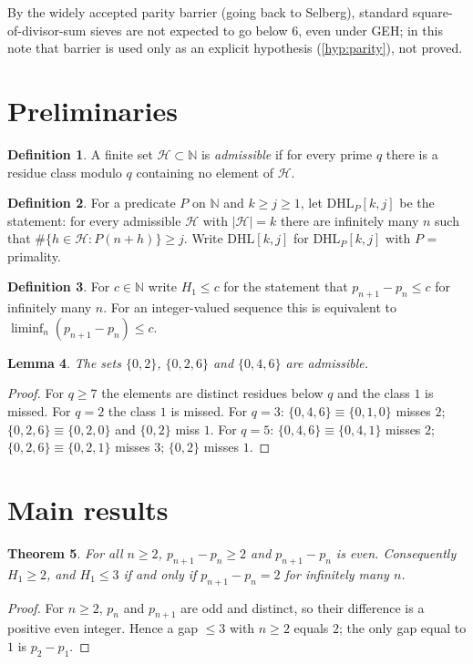 \documentclass[11pt]{amsart}
\theoremstyle{plain}
\newtheorem{theorem}{Theorem}[section]
\newtheorem{lemma}[theorem]{Lemma}
\theoremstyle{definition}
\newtheorem{definition}[theorem]{Definition}
\theoremstyle{remark}
\newcommand{\DHL}{\mathrm{DHL}}
\begin{document}
By the widely accepted parity barrier (going back to Selberg), standard square-of-divisor-sum sieves are not expected to go below $6$, even under GEH; in this note that barrier is used only as an explicit hypothesis (\cref{hyp:parity}), not proved.

\section{Preliminaries}\label{sec:prelim}

\begin{definition}\label{def:admissible}
A finite set $\mathcal H\subset\mathbb N$ is \emph{admissible} if for every prime $q$ there is a residue class modulo $q$ containing no element of $\mathcal H$.
\end{definition}

\begin{definition}\label{def:dhl}
For a predicate $P$ on $\mathbb N$ and $k\ge j\ge1$, let $\DHL_P[k,j]$ be the statement: for every admissible $\mathcal H$ with $|\mathcal H|=k$ there are infinitely many $n$ such that $\#\{h\in\mathcal H: P(n+h)\}\ge j$. Write $\DHL[k,j]$ for $\DHL_P[k,j]$ with $P$ = primality.
\end{definition}

\begin{definition}\label{def:H1le}
For $c\in\mathbb N$ write $H_1\le c$ for the statement that $p_{n+1}-p_n\le c$ for infinitely many $n$. For an integer-valued sequence this is equivalent to $\liminf_{n}(p_{n+1}-p_n)\le c$.
\end{definition}

\begin{lemma}\label{lem:adm}
The sets $\{0,2\}$, $\{0,2,6\}$ and $\{0,4,6\}$ are admissible.
\end{lemma}
\begin{proof}
For $q\ge7$ the elements are distinct residues below $q$ and the class $1$ is missed. For $q=2$ the class $1$ is missed. For $q=3$: $\{0,4,6\}\equiv\{0,1,0\}$ misses $2$; $\{0,2,6\}\equiv\{0,2,0\}$ and $\{0,2\}$ miss $1$. For $q=5$: $\{0,4,6\}\equiv\{0,4,1\}$ misses $2$; $\{0,2,6\}\equiv\{0,2,1\}$ misses $3$; $\{0,2\}$ misses $1$.
\end{proof}

\section{Main results}\label{sec:main}

\begin{theorem}\label{thm:gaps}
For all $n\ge2$, $p_{n+1}-p_n\ge2$ and $p_{n+1}-p_n$ is even. Consequently $H_1\ge2$, and $H_1\le3$ if and only if $p_{n+1}-p_n=2$ for infinitely many $n$.
\end{theorem}
\begin{proof}
For $n\ge2$, $p_n$ and $p_{n+1}$ are odd and distinct, so their difference is a positive even integer. Hence a gap $\le3$ with $n\ge2$ equals $2$; the only gap equal to $1$ is $p_2-p_1$.
\end{proof}
\end{document}

